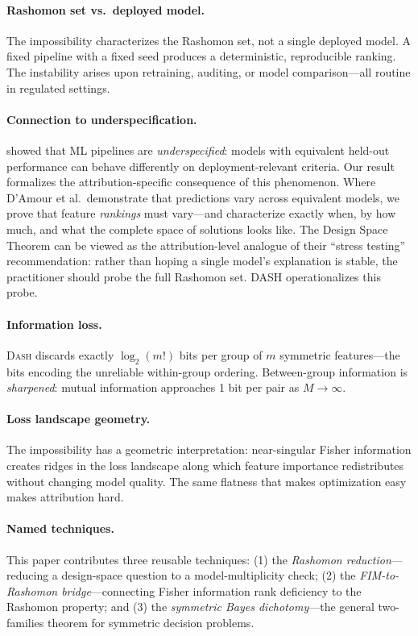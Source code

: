 \documentclass{article}
\newcommand{\DASH}{\textsc{Dash}}
\begin{document}
\paragraph{Rashomon set vs.\ deployed model.}
The impossibility characterizes the Rashomon set, not a single deployed model. A fixed pipeline with a fixed seed produces a deterministic, reproducible ranking. The instability arises upon retraining, auditing, or model comparison---all routine in regulated settings.

\paragraph{Connection to underspecification.}
\citep{damour2022underspecification} showed that ML pipelines are \emph{underspecified}: models with equivalent held-out performance can behave differently on deployment-relevant criteria. Our result formalizes the attribution-specific consequence of this phenomenon. Where D'Amour et al.\ demonstrate that predictions vary across equivalent models, we prove that feature \emph{rankings} must vary---and characterize exactly when, by how much, and what the complete space of solutions looks like. The Design Space Theorem can be viewed as the attribution-level analogue of their ``stress testing'' recommendation: rather than hoping a single model's explanation is stable, the practitioner should probe the full Rashomon set. DASH operationalizes this probe.

\paragraph{Information loss.}
\DASH{} discards exactly $\log_2(m!)$ bits per group of $m$ symmetric features---the bits encoding the unreliable within-group ordering. Between-group information is \emph{sharpened}: mutual information approaches 1 bit per pair as $M \to \infty$.

\paragraph{Loss landscape geometry.}
The impossibility has a geometric interpretation: near-singular Fisher information creates ridges in the loss landscape along which feature importance redistributes without changing model quality. The same flatness that makes optimization easy makes attribution hard.

\paragraph{Named techniques.}
This paper contributes three reusable techniques: (1) the \emph{Rashomon reduction}---reducing a design-space question to a model-multiplicity check; (2) the \emph{FIM-to-Rashomon bridge}---connecting Fisher information rank deficiency to the Rashomon property; and (3) the \emph{symmetric Bayes dichotomy}---the general two-families theorem for symmetric decision problems.
\end{document}
